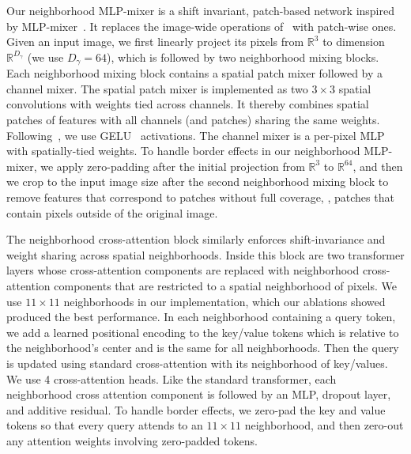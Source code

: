 \documentclass[main.tex]{subfiles}
\begin{document}
Our neighborhood MLP-mixer is a shift invariant, patch-based network inspired by MLP-mixer~\cite{tolstikhin2021mlpmixer}. It replaces the image-wide operations of~\cite{tolstikhin2021mlpmixer} with patch-wise ones. Given an input image, we first linearly project its pixels from $\mathbb{R}^3$ to dimension $\mathbb{R}^{D_\gamma}$ (we use $D_\gamma=64$), which is followed by two neighborhood mixing blocks. Each neighborhood mixing block contains a spatial patch mixer followed by a channel mixer. The spatial patch mixer is implemented as two $3 \times 3$ spatial convolutions with weights tied across channels. It thereby combines spatial patches of features with all channels (and patches) sharing the same weights. Following~\cite{tolstikhin2021mlpmixer}, we use GELU~\cite{DBLP:journals/corr/HendrycksG16} activations. The channel mixer is a per-pixel MLP with spatially-tied weights. To handle border effects in our neighborhood MLP-mixer, we apply zero-padding after the initial projection from $\mathbb{R}^{3}$ to $\mathbb{R}^{64}$, and then we crop to the input image size after the second neighborhood mixing block to remove features that correspond to patches without full coverage, \ie, patches that contain pixels outside of the original image.


The neighborhood cross-attention block similarly enforces shift-invariance and weight sharing across spatial neighborhoods. Inside this block are two transformer layers whose cross-attention components are replaced with neighborhood cross-attention components that are restricted to a spatial neighborhood of pixels. We use $11\times 11$ neighborhoods in our implementation, which our ablations showed produced the best performance. In each neighborhood containing a query token, we add a learned positional encoding to the key/value tokens which is relative to the neighborhood's center and is the same for all neighborhoods. Then the query is updated using standard cross-attention with its neighborhood of key/values. We use 4 cross-attention heads.  Like the standard transformer, each neighborhood cross attention component is followed by an MLP, dropout layer, and additive residual. To handle border effects, we zero-pad the key and value tokens so that every query attends to an $11 \times 11$ neighborhood, and then zero-out any attention weights involving zero-padded tokens.

\end{document}
